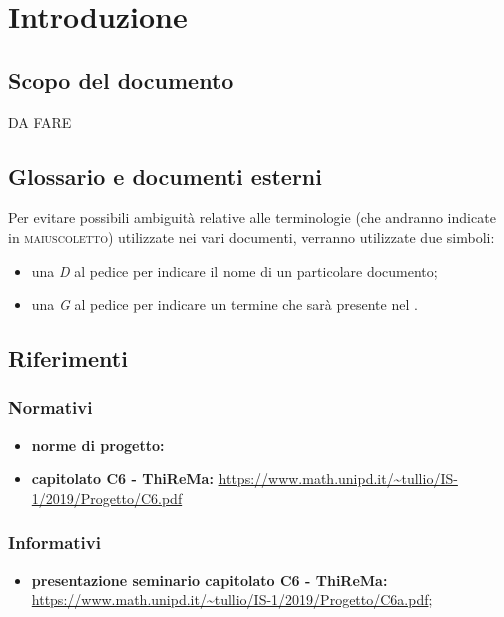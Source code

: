 \section{Introduzione}
	\subsection{Scopo del documento}
		DA FARE
			\subsection{Glossario e documenti esterni}
		Per evitare possibili ambiguità relative alle terminologie (che andranno indicate in \textsc{maiuscoletto}) utilizzate nei vari documenti, verranno utilizzate due simboli:
		\begin{itemize}
			\item una \textit{D} al pedice per indicare il nome di un particolare documento;
			\item una \textit{G} al pedice per indicare un termine che sarà presente nel .
		\end{itemize}
		\subsection{Riferimenti}
		\subsubsection{Normativi}
			\begin{itemize}
				\item \textbf{norme di progetto: } 
				\item \textbf{capitolato C6 - ThiReMa: }\url{https://www.math.unipd.it/~tullio/IS-1/2019/Progetto/C6.pdf}
			\end{itemize}
		\subsubsection{Informativi}
			\begin{itemize}
				\item \textbf{presentazione seminario capitolato C6 - ThiReMa: }\url{https://www.math.unipd.it/~tullio/IS-1/2019/Progetto/C6a.pdf};
			\end{itemize}